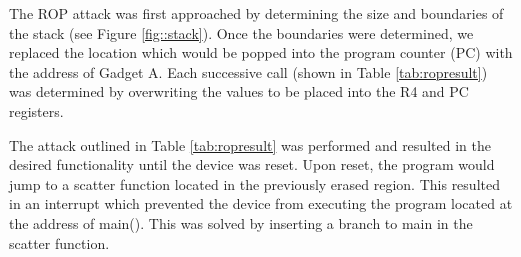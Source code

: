 The ROP attack was first approached by determining the size and boundaries of the stack (see Figure \ref{fig::stack}). Once the boundaries were determined, we replaced the location which would be popped into the program counter (PC) with the address of Gadget A. Each successive call (shown in Table \ref{tab:ropresult}) was determined by overwriting the values to be placed into the R4 and PC registers.

The attack outlined in Table \ref{tab:ropresult} was performed and resulted in the desired functionality until the device was reset. Upon reset, the program would jump to a scatter function located in the previously erased region. This resulted in an interrupt which prevented the device from executing the program located at the address of main(). This was solved by inserting a branch to main in the scatter function. 

